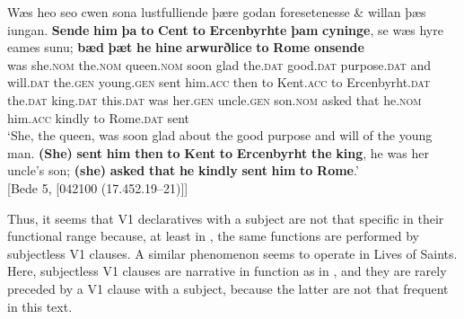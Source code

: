 \documentclass[output=paper,colorlinks,citecolor=brown]{langscibook}
\begin{document}
\ea \label{ex:cichosz:16}
\gll Wæs   heo     seo     cwen     sona   lustfulliende þære     godan     foresetenesse   \& willan     þæs iungan. \textbf{Sende}   \textbf{him}     \textbf{þa}   \textbf{to}   \textbf{Cent}     \textbf{to} \textbf{Ercenbyrhte} \textbf{þam}     \textbf{cyninge},   se   wæs   hyre     eames     sunu; \textbf{bæd}   \textbf{þæt}   \textbf{he}     \textbf{hine} \textbf{arwurðlice}   \textbf{to}   \textbf{Rome} \textbf{onsende}\\
was   she.\textsc{nom}   the.\textsc{nom}   queen.\textsc{nom}   soon   glad the.\textsc{dat}   good.\textsc{dat}    purpose.\textsc{dat}   and   will.\textsc{dat}   the.\textsc{gen} young.\textsc{gen}   sent   him.\textsc{acc}   then   to   Kent.\textsc{acc}   to Ercenbyrht.\textsc{dat} the.\textsc{dat}   king.\textsc{dat}  this.\textsc{dat} was   her.\textsc{gen}  uncle.\textsc{gen}  son.\textsc{nom} asked   that   he.\textsc{nom}   him.\textsc{acc}   kindly     to   Rome.\textsc{dat} sent\\
\glt ‘She, the queen, was soon glad about the good purpose and will of the young man. \textbf{(She)} \textbf{sent} \textbf{him} \textbf{then} \textbf{to} \textbf{Kent} \textbf{to} \textbf{Ercenbyrht} \textbf{the} \textbf{king}, he was her uncle's son; \textbf{(she)} \textbf{asked} \textbf{that} \textbf{he} \textbf{kindly} \textbf{sent} \textbf{him} \textbf{to} \textbf{Rome}.' \\ \hfill [Bede 5, [042100 (17.452.19--21)]]
\z 

Thus, it seems that V1 declaratives with a subject are not that specific in their functional range because, at least in , the same functions are performed by subjectless V1 clauses. A similar phenomenon seems to operate in Lives of Saints. Here, subjectless V1 clauses are narrative in function as in , and they are rarely preceded by a V1 clause with a subject, because the latter are not that frequent in this text.
\end{document}
